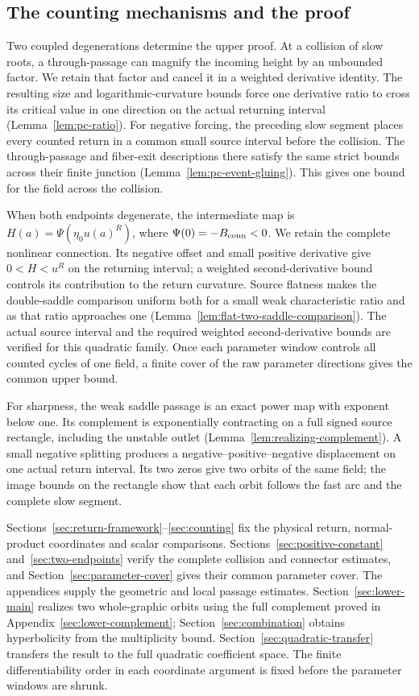 \subsection{The counting mechanisms and the proof}
Two coupled degenerations determine the upper proof. At a collision
of slow roots, a through-passage can magnify the incoming height by
an unbounded factor. We retain that factor and cancel it in a weighted
derivative identity. The resulting size and logarithmic-curvature
bounds force one derivative ratio to cross its critical value in one
direction on the actual returning interval
(Lemma~\ref{lem:pc-ratio}). For negative forcing, the preceding slow
segment places every counted return in a common small source interval
before the collision. The through-passage and fiber-exit descriptions
there satisfy the same strict bounds across their finite junction
(Lemma~\ref{lem:pc-event-gluing}). This gives one bound for the field
across the collision.

When both endpoints degenerate, the intermediate map is
$H(a)=\Psi(\eta_0u(a)^R)$, where $\Psi(0)=-B_{\rm conn}<0$.
We retain the complete nonlinear connection. Its negative offset and
small positive derivative give $0<H<u^R$ on the returning interval;
a weighted second-derivative bound controls its contribution to the
return curvature. Source flatness makes the double-saddle comparison uniform both
for a small weak characteristic ratio and as that ratio approaches
one (Lemma~\ref{lem:flat-two-saddle-comparison}). The actual source
interval and the required weighted second-derivative bounds
are verified for this quadratic family. Once each parameter window
controls all counted cycles of one field, a finite cover of the raw
parameter directions gives the common upper bound.

For sharpness, the weak saddle passage is an exact power map with
exponent below one. Its complement is exponentially contracting on
a full signed source rectangle, including the unstable outlet
(Lemma~\ref{lem:realizing-complement}). A small negative splitting
produces a negative--positive--negative displacement on one actual
return interval. Its two zeros give two orbits of the same field;
the image bounds on the rectangle show that each orbit follows the
fast arc and the complete slow segment.

Sections~\ref{sec:return-framework}--\ref{sec:counting} fix the physical
return, normal-product coordinates and scalar comparisons.
Sections~\ref{sec:positive-constant} and~\ref{sec:two-endpoints}
verify the complete collision and connector estimates, and
Section~\ref{sec:parameter-cover} gives their common parameter cover.
The appendices supply the geometric and local passage estimates.
Section~\ref{sec:lower-main} realizes two whole-graphic orbits using
the full complement proved in Appendix~\ref{sec:lower-complement};
Section~\ref{sec:combination} obtains hyperbolicity from the multiplicity
bound. Section~\ref{sec:quadratic-transfer} transfers the result to the
full quadratic coefficient space.
The finite differentiability order in each coordinate argument is
fixed before the parameter windows are shrunk.

